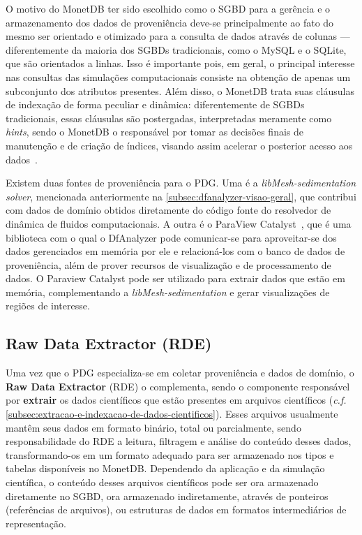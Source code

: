 O motivo do MonetDB ter sido escolhido como o SGBD para a gerência e o armazenamento dos dados de proveniência deve-se principalmente ao fato do mesmo ser orientado e otimizado para a consulta de dados através de colunas --- diferentemente da maioria dos SGBDs tradicionais, como o MySQL e o SQLite, que são orientados a linhas. Isso é importante pois, em geral, o principal interesse nas consultas das simulações computacionais consiste na obtenção de apenas um subconjunto dos atributos presentes.
Além disso, o MonetDB trata suas cláusulas de indexação de forma peculiar e dinâmica: diferentemente de SGBDs tradicionais, essas cláusulas são postergadas, interpretadas meramente como \textit{hints}, sendo o MonetDB o responsável por tomar as decisões finais de manutenção e de criação de índices, visando assim acelerar o posterior acesso aos dados~\cite{url:monetdb}.

Existem duas fontes de proveniência para o PDG. Uma é a \textit{libMesh-sedimentation solver}, mencionada anteriormente na \autoref{subsec:dfanalyzer-visao-geral}, que contribui com dados de domínio obtidos diretamente do código fonte do resolvedor de dinâmica de fluidos computacionais. A outra é o ParaView Catalyst~\cite{ayachit2015paraview}, que é uma biblioteca com o qual o DfAnalyzer pode comunicar-se para aproveitar-se dos dados gerenciados em memória por ele e relacioná-los com o banco de dados de proveniência, além de prover recursos de visualização e de processamento de dados. O Paraview Catalyst pode ser utilizado para extrair dados que estão em memória, complementando a \textit{libMesh-sedimentation} e gerar visualizações de regiões de interesse.

\subsection{Raw Data Extractor (RDE)}

Uma vez que o PDG especializa-se em coletar proveniência e dados de domínio, o \textbf{Raw Data Extractor} (RDE) o complementa, sendo o componente responsável por \textbf{extrair} os dados científicos que estão presentes em arquivos científicos (\textit{c.f.} \autoref{subsec:extracao-e-indexacao-de-dados-cientificos}). Esses arquivos usualmente mantêm seus dados em formato binário, total ou parcialmente, sendo responsabilidade do RDE a leitura, filtragem e análise do conteúdo desses dados, transformando-os em um formato adequado para ser armazenado nos tipos e tabelas disponíveis no MonetDB. Dependendo da aplicação e da simulação científica, o conteúdo desses arquivos científicos pode ser ora armazenado diretamente no SGBD, ora armazenado indiretamente, através de ponteiros (referências de arquivos), ou estruturas de dados em formatos intermediários de representação.

